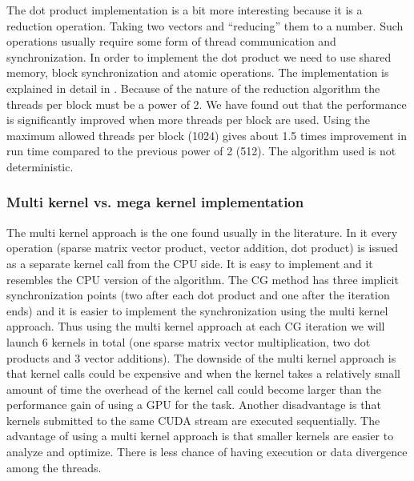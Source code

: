 The dot product implementation is a bit more interesting because it is a reduction operation. Taking two vectors and ``reducing'' them to a number. Such operations usually require some form of thread communication and synchronization. In order to implement the dot product we need to use shared memory, block synchronization and atomic operations. The implementation is explained in detail in \cite{CUDA-by-example}. Because of the nature of the reduction algorithm the threads per block must be a power of 2. We have found out that the performance is significantly improved when more threads per block are used. Using the maximum allowed threads per block (1024) gives about 1.5 times improvement in run time compared to the previous power of 2 (512). The algorithm used is not deterministic.

\subsubsection{Multi kernel vs. mega kernel implementation}
The multi kernel approach is the one found usually in the literature. In it every operation (sparse matrix vector product, vector addition, dot product) is issued as a separate kernel call from the CPU side. It is easy to implement and it resembles the CPU version of the algorithm. The CG method has three implicit synchronization points (two after each dot product and one after the iteration ends) and it is easier to implement the synchronization using the multi kernel approach. Thus using the multi kernel approach at each CG iteration we will launch 6 kernels in total (one sparse matrix vector multiplication, two dot products and 3 vector additions).  The downside of the multi kernel approach is that kernel calls could be expensive and when the kernel takes a relatively small amount of time the overhead of the kernel call could become larger than the performance gain of using a GPU for the task. Another disadvantage is that kernels submitted to the same CUDA stream are executed sequentially. The advantage of using a multi kernel approach is that smaller kernels are easier to analyze and optimize. There is less chance of having execution or data divergence among the threads.


